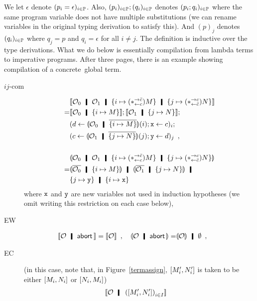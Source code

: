 We let $\epsilon$ denote $(p_i = \epsilon)_{i\in\mathbb{P}}$.
Also, $(p_i)_{i\in\mathbb{P}}; (q_i)_{i\in\mathbb{P}}$ denotes
$(p_i; q_i)_{i\in\mathbb{P}}$ where the
same program variable does not have multiple substitutions
(we can rename variables in the original typing derivation to satisfy
this).
And $(p)_j$ denotes $(q_i)_{i\in\mathbb{P}}$ where $q_j = p$ and $q_i =
\epsilon$ for all $i\neq j$.
The definition is inductive over the type derivations. What we do below is
essentially compilation from lambda terms to imperative programs.
After three pages, there is an example showing compilation of a concrete
\lgd\,global term.
\begin{description}
 \item[$ij$-com]
      \begin{align*}
       &\semo{\hypert_0\hmid\hypert_1\hmid \imapsto{(\comodL) M}\hmid
       \jmapsto{(\comodR) N}} \\
       =& \semo{\hypert_0\hmid \imapsto{M}};
       \semo{\hypert_1\hmid \jmapsto{N}};\\
       &(d\leftarrow \semoi{\hypert_0\hmid\overline{\imapsto{M}}}(i); \p
       x\leftarrow c)_i; \\
       &(c\leftarrow \semoi{\hypert_1\hmid\overline{\jmapsto{N}}}(j); \p
       y\leftarrow d)_j\enspace,\\ \\
       &\semoi{\hypert_0\hmid\hypert_1\hmid \imapsto{(\comodL) M}\hmid
       \jmapsto{(\comodR) N}} \\=&
       \semoi{\overline{\hypert_0}\hmid \imapsto{M}} \hmid
       \semoi{\overline{\hypert_1}\hmid \jmapsto{N}}
       \hmid\\& \{j\mapsto\p y\}\hmid \{i\mapsto \p x\}
      \end{align*}
      where $\texttt{x}$ and $\texttt{y}$ are new variables not used in induction
      hypotheses (we omit writing this restriction on each case below),
 \item[EW] \begin{align*}
 \semo{\hypert\hmid \abort}=\semo{\hypert}\enspace,\quad
 \semoi{\hypert\hmid\abort}=&\semoi{\hypert}\hmid \emptyset\enspace,\quad
	   \end{align*}
 \item[EC] (in this case, note that, in Figure~\ref{termassign},
      $[{M_i',N_i'}]$ is taken
      to be either $[{M_i,N_i}]$ or $[{N_i,M_i}]$)
      \begin{align*}
         &\semo{ \hypert \hmid \left(\cotuple{M'_i,N'_i}\right)_{i\in I}
}
\end{align*}
\end{description}
